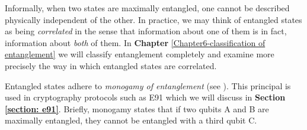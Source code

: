 Informally, when two states are maximally entangled, one cannot be described physically independent of the other.  In practice, we may think of entangled states as being {\emph{correlated}} in the sense that information about one of them is in fact, information about {\emph{both}} of them. In {\bf{Chapter}} \ref{Chapter6-classification of entanglement} we will classify entanglement completely and examine more precisely the way in which entangled states are correlated. 

Entangled states adhere to {\emph{monogamy of entanglement}} (see \cite{Toner2006}).  This principal is used in cryptography protocols such as E91 which we will discuss in \textbf{Section \ref{section: e91}}. Briefly, monogamy states that if two qubits A and B are maximally entangled, they cannot be entangled with a third qubit C. 


